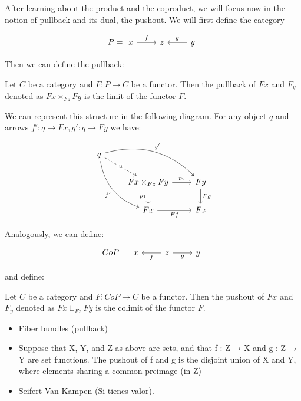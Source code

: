 

After learning about the product and the coproduct, we will focus now in the notion of pullback and its dual, the pushout. We will first define the category

\[
  P = \begin{tikzcd}
    x\arrow{r}{f} & z & y\arrow[swap]{l}{g}
\end{tikzcd}
\]

Then we can define the pullback:

\begin{definition}
  Let $C$ be a category and $F:P\to C$ be a functor. Then the pullback of $Fx$ and $F_y$ denoted as $Fx\times_{Fz}Fy$ is the limit of the functor $F$.
\end{definition}

We can represent this structure in the following diagram. For any object $q$ and arrows $f':q\to Fx,g':q\to Fy$ we have:

\[
\begin{tikzcd}
q
\arrow[bend left]{drr}{g'}
\arrow[bend right,swap]{ddr}{f'}
\arrow[dashed]{dr}[description]{u} & & \\
& Fx\times_{Fz}Fy \arrow{r}{p_2} \arrow{d}[swap]{p_1}
& Fy \arrow{d}{Fg} \\
& Fx \arrow[swap]{r}{Ff}
& Fz
\end{tikzcd}
\]

Analogously, we can define:

\[
  CoP = \begin{tikzcd}
    x & z\arrow{l}{f}\arrow[swap]{r}{g} & y
\end{tikzcd}
\]

and define:
\begin{definition}
  Let $C$ be a category and $F:CoP\to C$ be a functor. Then the pushout of $Fx$ and $F_y$ denoted as $Fx\sqcup_{Fz}Fy$ is the colimit of the functor $F$.
\end{definition}

\begin{example}
  \begin{itemize}
  \item Fiber bundles (pullback)
  \item Suppose that X, Y, and Z as above are sets, and that f : Z → X and g : Z → Y are set functions. The pushout of f and g is the disjoint union of X and Y, where elements sharing a common preimage (in Z)
   \item Seifert-Van-Kampen (Si tienes valor).
  \end{itemize}
\end{example}

